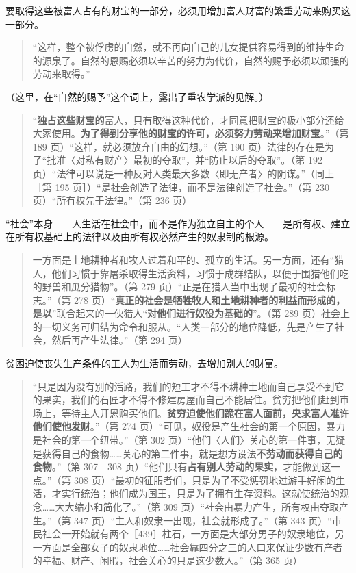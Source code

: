 要取得这些被富人占有的财宝的一部分，必须用增加富人财富的繁重劳动来购买这一部分。

\begin{quote}“这样，整个被俘虏的自然，就不再向自己的儿女提供容易得到的维持生命的源泉了。自然的恩赐必须以辛苦的努力为代价，自然的赐予必须以顽强的劳动来取得。”\end{quote}

（这里，在“自然的赐予”这个词上，露出了重农学派的见解。）

\begin{quote}“\textbf{独占这些财宝的}富人，只有取得这种代价，才同意把财宝的极小部分还给大家使用。\textbf{为了得到分享他的财宝的许可，必须努力劳动来增加财宝}。”（第 189 页）“这样，就必须放弃自由的幻想。”（第 190 页）法律的存在是为了“批准〈对私有财产〉最初的夺取”，并“防止以后的夺取”。（第 192 页）“法律可以说是一种反对人类最大多数〈即无产者〉的阴谋。”（同上［第 195 页］）“是社会创造了法律，而不是法律创造了社会。”（第 230 页）“所有权先于法律。”（第 236 页）\end{quote}

“社会”本身——人生活在社会中，而不是作为独立自主的个人——是所有权、建立在所有权基础上的法律以及由所有权必然产生的奴隶制的根源。

\begin{quote}一方面是土地耕种者和牧人过着和平的、孤立的生活。另一方面，还有“猎人，他们习惯于靠屠杀取得生活资料，习惯于成群结队，以便于围猎他们吃的野兽和瓜分猎物”。（第 279 页）“正是在猎人当中出现了最初的社会标志。”（第 278 页）“\textbf{真正的社会是牺牲牧人和土地耕种者的利益而形成的，是以}”联合起来的一伙猎人“\textbf{对他们进行奴役为基础的}”。（第 289 页）社会上的一切义务可归结为命令和服从。“人类一部分的地位降低，先是产生了社会，然后再产生法律。”（第 294 页）\end{quote}

贫困迫使丧失生产条件的工人为生活而劳动，去增加别人的财富。

\begin{quote}“只是因为没有别的活路，我们的短工才不得不耕种土地而自己享受不到它的果实，我们的石匠才不得不修建房屋而自己不能居住。贫穷把他们赶到市场上，等待主人开恩购买他们。\textbf{贫穷迫使他们跪在富人面前，央求富人准许他们使他发财}。”（第 274 页）“可见，奴役是产生社会的第一个原因，暴力是社会的第一个纽带。”（第 302 页）“他们〈人们〉关心的第一件事，无疑是获得自己的食物……关心的第二件事，就是想方设法\textbf{不劳动而获得自己的食物}。”（第 307—308 页）“他们只有\textbf{占有别人劳动的果实}，才能做到这一点。”（第 308 页）“最初的征服者们，只是为了不受惩罚地过游手好闲的生活，才实行统治；他们成为国王，只是为了拥有生存资料。这就使统治的观念……大大缩小和简化了。”（第 309 页）“社会由暴力产生，所有权由夺取产生。”（第 347 页）“主人和奴隶一出现，社会就形成了。”（第 343 页）“市民社会一开始就有两个［439］柱石，一方面是大部分男子的奴隶地位，另一方面是全部女子的奴隶地位……社会靠四分之三的人口来保证少数有产者的幸福、财产、闲暇，社会关心的只是这少数人。”（第 365 页）\end{quote}

